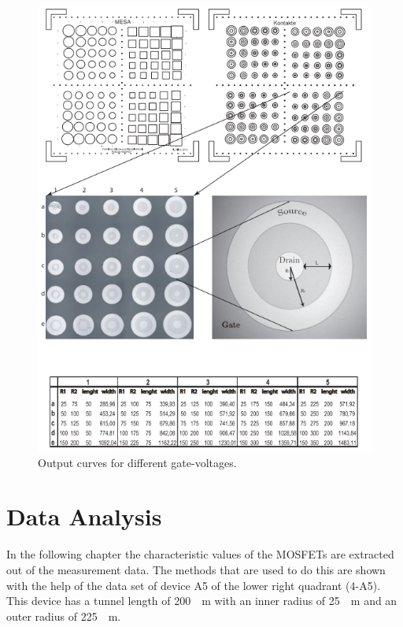 \documentclass[%
 reprint,
amsmath,amssymb,
pra,
]{revtex4-1}
\begin{document}
\begin{figure}
\centering
\includegraphics[scale=0.6]{Bilder/Screenshot_1.png}
\caption{Output curves for different gate-voltages.\cite{Anleitung}}
\label{fig:bezeichnung}
\end{figure}

\section{Data Analysis}
In the following chapter the characteristic values of the MOSFETs are extracted out of the measurement data. The methods that are used to do this are shown with the help of the data set of device A5 of the lower right quadrant (4-A5). This device has a tunnel length of \SI{200}{\mu m} with an inner radius of \SI{25}{\mu m} and an outer radius of \SI{225}{\mu m}.
\end{document}
